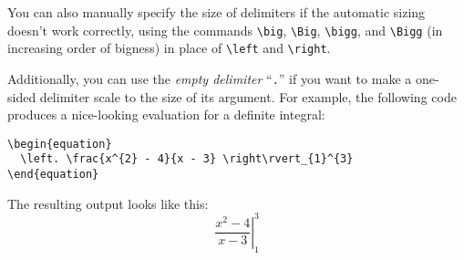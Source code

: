 \documentclass{article}
\newcommand*{\code}[1]{\texttt{#1}}
\begin{document}
You can also manually specify the size of delimiters if the automatic sizing doesn't work correctly, using the commands \code{\textbackslash{}big}, \code{\textbackslash{}Big}, \code{\textbackslash{}bigg}, and \code{\textbackslash{}Bigg} (in increasing order of bigness) in place of \code{\textbackslash{}left} and \code{\textbackslash{}right}.

Additionally, you can use the \emph{empty delimiter} \enquote{\code{.}} if you want to make a one-sided delimiter scale to the size of its argument.
For example, the following code produces a nice-looking evaluation for a definite integral:
\begin{verbatim}
\begin{equation}
  \left. \frac{x^{2} - 4}{x - 3} \right\rvert_{1}^{3}
\end{equation}
\end{verbatim}
The resulting output looks like this:
\begin{equation}
  \label{eq:evalex}
  \left. \frac{x^{2} - 4}{x - 3} \right\rvert_{1}^{3}
\end{equation}
\end{document}
